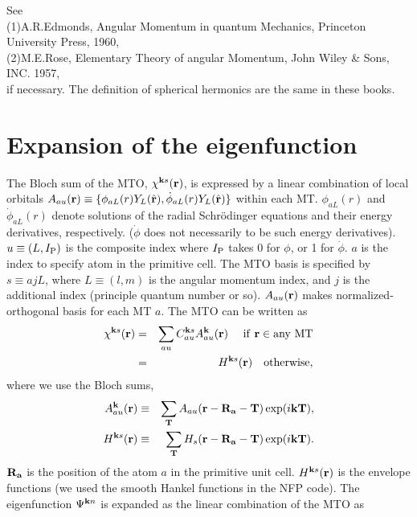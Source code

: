 \documentclass[a4paper,10pt,epsf,fleqn]{article}
\begin{document}
{{{\begin{thebibliography}{00}
\noindent See\\
(1)A.R.Edmonds, Angular Momentum in quantum Mechanics, 
Princeton University Press, 1960,\\
(2)M.E.Rose, Elementary Theory of angular Momentum,
John Wiley \& Sons, INC. 1957,\\
if necessary. The definition of spherical hermonics are the same in these books.







\newpage
\section{Expansion of the eigenfunction}
The Bloch sum of the MTO, $\chi^{{\bf k}s}({\bf r})$, is 
expressed by a linear combination of local orbitals
$A_{au}({\bf r})
\equiv \{ \phi_{aL}(r) Y_L(\hat{\bf r}),\dot{\phi}_{aL}(r) Y_L(\hat{\bf r}) \}$
within each MT.
$\phi_{aL}(r)$ and $\dot{\phi}_{aL}(r)$ denote solutions of
the radial Schr\"odinger equations and their energy derivatives, respectively.
($\dot{\phi}$ does not necessarily to be such energy derivatives).
$u \equiv(L, I_{\rm P})$ is the composite index
where $I_{\rm P}$ takes 0 for $\phi$, or 1 for $\dot{\phi}$.
$a$ is the index to specify atom in the primitive cell.
The MTO basis is specified by $s \equiv {ajL}$, where
$L\equiv(l,m)$ is the angular momentum index, and $j$ is the additional
index (principle quantum number or so). 
$A_{au}({\bf r})$ makes normalized-orthogonal basis for each MT $a$.
The MTO can be written as
\begin{eqnarray}
\label{coeff}
\chi^{{\bf k}s}({\bf r}) &=& \sum_{a u} C^{{\bf k}s}_{a u} A^{\bf k}_{a u}({\bf r})   \ \ \ {\rm \ if \ {\bf r} \in any \ MT} \nonumber \\
        &=&   H^{{\bf k}s}({\bf r}) \ \ \ {\rm otherwise},
\end{eqnarray}
where we use the Bloch sums,
\begin{eqnarray}
A^{\bf k}_{a u}({\bf r}) &\equiv& \sum_{\bf T} A_{a u}({\bf r-R_a-T}) \exp(i {\bf kT}), \\
H^{{\bf k}s}({\bf r})   &\equiv& \sum_{\bf T} H_{s}({\bf r-R_a-T}) \exp(i {\bf kT}).
\end{eqnarray}
${\bf R_a}$ is the position of the atom $a$ in the primitive unit cell.
$H^{{\bf k}s}({\bf r})$ is the envelope functions (we used the smooth Hankel functions in the NFP code).
The eigenfunction $\Psi^{{\bf k}n}$ is expanded as the linear combination of the MTO as

\end{thebibliography}}}}
\end{document}
